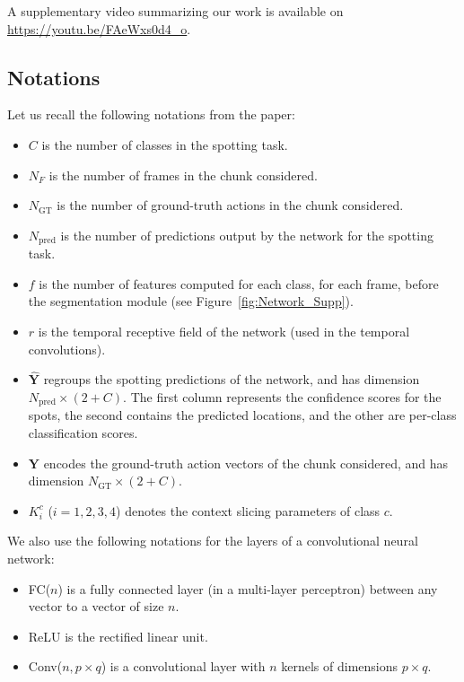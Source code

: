 \documentclass[10pt,twocolumn,letterpaper]{article}
\begin{document}
A supplementary video summarizing our work is available on 
\url{https://youtu.be/FAeWxs0d4_o}.


\subsection{Notations}
Let us recall the following notations from the paper:
\begin{itemize}
    \item $C$ is the number of classes in the spotting task.
    \item $N_F$ is the number of frames in the chunk considered.
    \item $N_\text{GT}$ is the number of ground-truth actions in the chunk considered.
    \item $N_\text{pred}$ is the number of predictions output by the network for the spotting task.
    \item $f$ is the number of features computed for each class, for each frame, before the segmentation module (see Figure~\ref{fig:Network_Supp}).
    \item $r$ is the temporal receptive field of the network (used in the temporal convolutions).
    \item $\hat{\textbf{Y}}$ regroups the spotting predictions of the network, and has  dimension $N_\text{pred}\times (2+C)$. The first column represents the confidence scores for the spots, the second contains the predicted locations, and the other are per-class classification scores.
    \item $\textbf{Y}$ encodes the ground-truth action vectors of the chunk considered, and has dimension $N_\text{GT}\times (2+C)$. 
    \item $K^c_i$ ($i=1,2,3,4$) denotes the context slicing parameters of class $c$.
\end{itemize}

We also use the following notations for the layers of a convolutional neural network:
\begin{itemize}
    \item FC($n$) is a fully connected layer (\eg in a multi-layer perceptron) between any vector to a vector of size $n$. 
    \item ReLU is the rectified linear unit.
    \item Conv($n, p\times q$) is a convolutional layer with $n$ kernels of dimensions $p\times q$.
\end{itemize}
\end{document}
